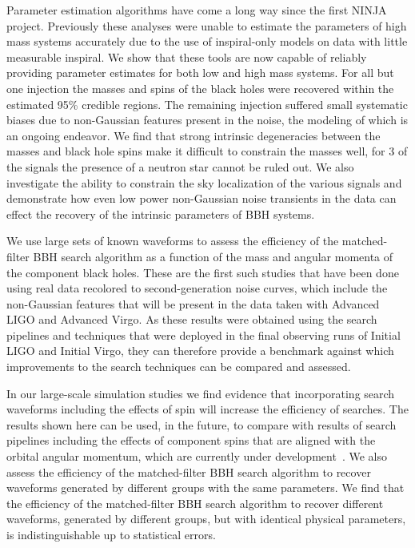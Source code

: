 Parameter estimation algorithms have come a long way since the first NINJA
project. Previously these analyses were unable to estimate the parameters of
high mass systems accurately due to the use of inspiral-only models on data
with little measurable inspiral. We show that these tools are now capable of
reliably providing parameter estimates for both low and high mass systems.
For all but one injection the masses and spins of the black holes were recovered
within the estimated 95\% credible regions.  The remaining injection suffered
small systematic biases due to non-Gaussian features present in the noise, the
modeling of which is an ongoing endeavor.
We find that strong intrinsic degeneracies between the masses and black hole 
spins \cite{Baird:2012cu,Hannam:2013uu} make it difficult to constrain the 
masses well, for 3 of the signals the 
presence of a neutron star cannot be ruled out. We also investigate the ability 
to constrain the sky localization of the various signals and demonstrate how 
even low power non-Gaussian noise transients in the data can effect the 
recovery of the intrinsic parameters of BBH systems.

We use large sets of known waveforms to assess the 
efficiency of the matched-filter BBH search algorithm as a 
function of the mass and angular momenta of the component black holes. 
These are the first such studies that have been done using real data recolored 
to second-generation noise curves, which include the non-Gaussian features that 
will be present in the data taken with Advanced LIGO and Advanced Virgo. 
As these results were obtained using the search pipelines and techniques that
were deployed in the final observing runs of Initial LIGO and Initial Virgo, 
they can therefore provide a benchmark against which improvements to the search 
techniques can be compared and assessed. 

In our large-scale simulation studies we find 
evidence that incorporating search waveforms including the effects of spin will 
increase the efficiency of searches. The results shown here can be used, in the 
future, to 
compare with results of search pipelines including the effects of component 
spins that are aligned with the orbital angular momentum, which are currently 
under development~\cite{Brown:2012qf,Ajith:2012mn,Harry:2013tca}. We also 
assess 
the efficiency of the matched-filter 
BBH search algorithm to recover waveforms generated by different 
groups with the same parameters. We find that the 
efficiency of the matched-filter BBH search algorithm to recover 
different waveforms, generated by different groups, but with identical physical 
parameters, is indistinguishable up to statistical errors.

